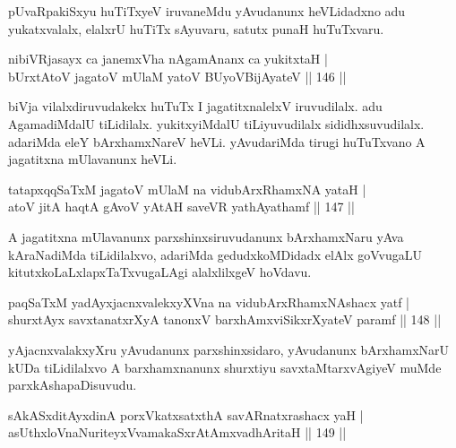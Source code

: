\begin{artha}
pUvaRpakiSxyu huTiTxyeV iruvaneMdu yAvudanunx heVLidadxno adu yukatxvalalx, elalxrU huTiTx sAyuvaru, satutx punaH huTuTxvaru.
\end{artha}


\begin{shl}
nibiVRjasayx ca janemxVha nA\s \s gamAnanx ca yukitxtaH |\\
bUrxtAtoV jagatoV mUlaM yatoV BUyoV\s BijAyateV \hfill || 146 ||
\end{shl}

\begin{artha}
biVja vilalxdiruvudakekx huTuTx I jagatitxnalelxV iruvudilalx. adu AgamadiMdalU tiLidilalx. yukitxyiMdalU tiLiyuvudilalx sididhxsuvudilalx. adariMda eleY bArxhamxNareV heVLi. yAvudariMda tirugi huTuTxvano A jagatitxna mUlavanunx heVLi.
\end{artha}

\begin{shl}
tatapxqqSaTxM jagatoV mUlaM na vidubArxRhamxNA yataH |\\
atoV jitA haqtA gAvoV yAtAH saveVR yathAyathamf \hfill || 147 ||
\end{shl}

\begin{artha}
A jagatitxna mUlavanunx parxshinxsiruvudanunx bArxhamxNaru yAva kAraNadiMda tiLidilalxvo, adariMda gedudxkoMDidadx elAlx goVvugaLU kitutxkoLaLxlapxTaTxvugaLAgi alalxlilxgeV hoVdavu.
\end{artha}

\begin{shl}
paqSaTxM yadAyxjacnxvalekxyXVna na vidubArxRhamxNAshacx yatf |\\
shurxtAyx savxtanatxrXyA tanonxV barxhAmx\s \s viSikxrXyateV paramf \hfill || 148 ||
\end{shl}

\begin{artha}%
yAjacnxvalakxyXru yAvudanunx parxshinxsidaro, yAvudanunx bArxhamxNarU kUDa tiLidilalxvo A barxhamxnanunx shurxtiyu savxtaMtarxvAgiyeV muMde parxkAshapaDisuvudu.
\end{artha}

\begin{shl}
sAkASxditAyxdinA porxVkatxsatxthA savARnatxrashacx yaH |\\
asUthxloV\s naNuriteyxVvamakaSxrAtAmx\s vadhAritaH \hfill || 149 ||
\end{shl}

